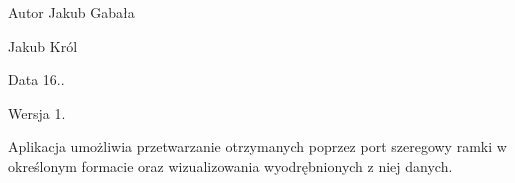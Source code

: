 \begin{DoxyAuthor}{Autor}
Jakub Gabała 

Jakub Król 
\end{DoxyAuthor}
\begin{DoxyDate}{Data}
16.. 
\end{DoxyDate}
\begin{DoxyVersion}{Wersja}
1.
\end{DoxyVersion}
Aplikacja umożliwia przetwarzanie otrzymanych poprzez port szeregowy ramki w określonym formacie oraz wizualizowania wyodrębnionych z niej danych. 